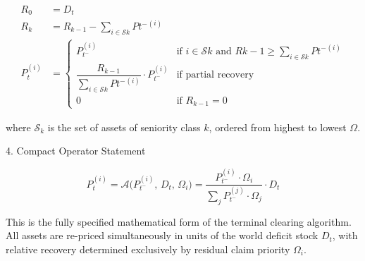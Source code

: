 \[
\begin{align*}
R_0 &= D_t \\
R_{k} &= R_{k-1} - \sum_{i \in \mathcal{S}k} P{t^-}^{(i)} \\
P_t^{(i)} &= 
\begin{cases}
P_{t^-}^{(i)} & \text{if } i \in \mathcal{S}k \text{ and } R{k-1} \ge \sum_{i \in \mathcal{S}k} P{t^-}^{(i)} \\
\dfrac{R_{k-1}}{\sum_{i \in \mathcal{S}k} P{t^-}^{(i)}} \cdot P_{t^-}^{(i)} & \text{if partial recovery} \\
0 & \text{if } R_{k-1} = 0
\end{cases}
\end{align*}
\]

where \(\mathcal{S}_k\) is the set of assets of seniority class \(k\), ordered from highest to lowest \(\Omega\).

4. Compact Operator Statement

\[
P_t^{(i)} 
= 
\mathcal{A}\bigl(P_{t^-}^{(i)},\, D_t,\, \Omega_i\bigr)
=
\frac{P_{t^-}^{(i)} \cdot \Omega_i}{\sum_j P_{t^-}^{(j)} \cdot \Omega_j} \cdot D_t
\]

This is the fully specified mathematical form of the terminal clearing algorithm. All assets are re-priced simultaneously in units of the world deficit stock \(D_t\), with relative recovery determined exclusively by residual claim priority \(\Omega_i\).
